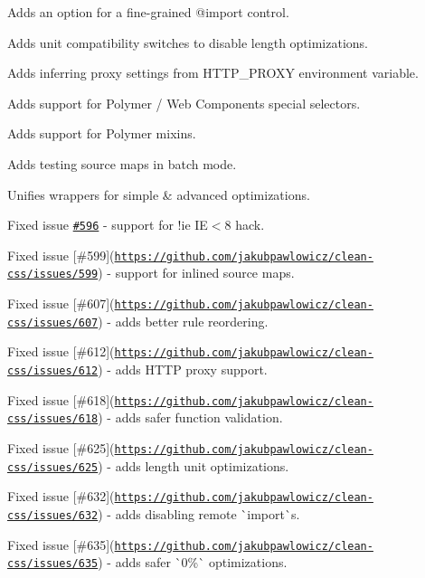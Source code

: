\begin{DoxyItemize}
\item Adds an option for a fine-\/grained {\ttfamily @import} control.
\item Adds unit compatibility switches to disable length optimizations.
\item Adds inferring proxy settings from H\+T\+T\+P\+\_\+\+P\+R\+O\+XY environment variable.
\item Adds support for Polymer / Web Components special selectors.
\item Adds support for Polymer mixins.
\item Adds testing source maps in batch mode.
\item Unifies wrappers for simple \& advanced optimizations.
\item Fixed issue \href{https://github.com/jakubpawlowicz/clean-css/issues/596}{\tt \#596} -\/ support for !ie IE$<$8 hack.
\item Fixed issue \mbox{[}\#599\mbox{]}(\href{https://github.com/jakubpawlowicz/clean-css/issues/599}{\tt https\+://github.\+com/jakubpawlowicz/clean-\/css/issues/599}) -\/ support for inlined source maps.
\item Fixed issue \mbox{[}\#607\mbox{]}(\href{https://github.com/jakubpawlowicz/clean-css/issues/607}{\tt https\+://github.\+com/jakubpawlowicz/clean-\/css/issues/607}) -\/ adds better rule reordering.
\item Fixed issue \mbox{[}\#612\mbox{]}(\href{https://github.com/jakubpawlowicz/clean-css/issues/612}{\tt https\+://github.\+com/jakubpawlowicz/clean-\/css/issues/612}) -\/ adds H\+T\+TP proxy support.
\item Fixed issue \mbox{[}\#618\mbox{]}(\href{https://github.com/jakubpawlowicz/clean-css/issues/618}{\tt https\+://github.\+com/jakubpawlowicz/clean-\/css/issues/618}) -\/ adds safer function validation.
\item Fixed issue \mbox{[}\#625\mbox{]}(\href{https://github.com/jakubpawlowicz/clean-css/issues/625}{\tt https\+://github.\+com/jakubpawlowicz/clean-\/css/issues/625}) -\/ adds length unit optimizations.
\item Fixed issue \mbox{[}\#632\mbox{]}(\href{https://github.com/jakubpawlowicz/clean-css/issues/632}{\tt https\+://github.\+com/jakubpawlowicz/clean-\/css/issues/632}) -\/ adds disabling remote \`{}import\`{}s.
\item Fixed issue \mbox{[}\#635\mbox{]}(\href{https://github.com/jakubpawlowicz/clean-css/issues/635}{\tt https\+://github.\+com/jakubpawlowicz/clean-\/css/issues/635}) -\/ adds safer \`{}0\%\`{} optimizations.

\end{DoxyItemize}
